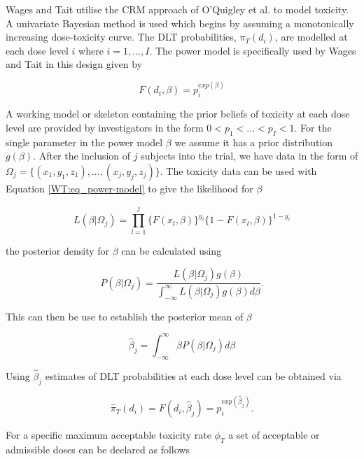 Wages and Tait \cite{wagesSeamlessPhaseII2015} utilise the CRM approach of O'Quigley et al. \cite{oquigleyContinualReassessmentMethod1990} to model toxicity. A univariate Bayesian method is used which begins by assuming a monotonically increasing dose-toxicity curve. The DLT probabilities, $\pi_T(d_i)$, are modelled at each dose level $i$ where $i= 1, ..., I$. The power model is specifically used by Wages and Tait in this design given by 

\begin{equation}
\label{WT:eq_power-model}
F(d_i, \beta) = p_i^{exp(\beta)}
\end{equation}

A working model or skeleton containing the prior beliefs of toxicity at each dose level are provided by investigators in the form $0 < p_1 < ... <p_I <1$. For the single parameter in the power model $\beta$ we assume it has a prior distribution $g(\beta)$. After the inclusion of $j$ subjects into the trial, we have  data in the form of $\Omega_j = \{(x_1,y_1,z_1), ..., (x_j,y_j,z_j)\}$. The toxicity data can be used with Equation \ref{WT:eq_power-model} to give the likelihood for $\beta$

\begin{equation}
L(\beta|\Omega_j)=\prod_{l=1}^{j}\{F(x_l,\beta)\}^{y_l}\{1-F(x_l,\beta)\}^{1-y_l}  
\end{equation}

the posterior density for $\beta$ can be calculated using  

\begin{equation}
P(\beta|\Omega_j) = \frac{L(\beta|\Omega_j)g(\beta)}{\int_{-\infty}^{\infty}L(\beta|\Omega_j)g(\beta)d\beta}. 
\end{equation}

This can then be use to establish the posterior mean of $\beta$

\begin{equation}
\hat{\beta}_j = \int_{-\infty}^{\infty}\beta P(\beta|\Omega_j)d\beta
\end{equation} 

Using $\hat{\beta}_j$ estimates of DLT probabilities at each dose level can be obtained via 

\begin{equation}
\hat{\pi}_T(d_i) = F(d_i, \hat{\beta}_j) = p_i^{exp(\hat{\beta}_j)}. 
\end{equation}

For a specific maximum acceptable toxicity rate $\phi_T$ a set of acceptable or admissible doses can be declared as follows


